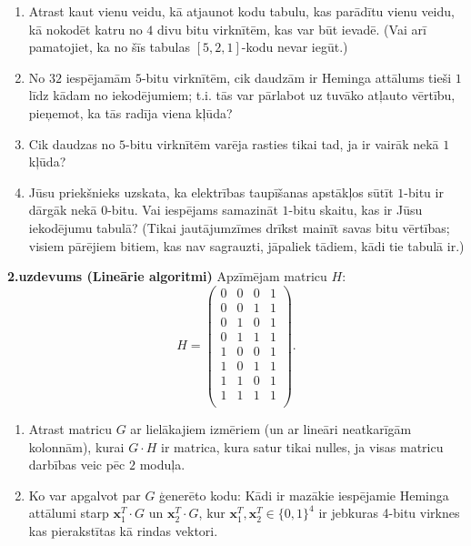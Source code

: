\documentclass[a4paper,12pt]{article}
\begin{document}
\begin{enumerate}
\item Atrast kaut vienu veidu, kā atjaunot kodu tabulu,
kas parādītu vienu veidu, kā nokodēt katru no $4$ divu bitu virknītēm, 
kas var būt ievadē. (Vai arī pamatojiet, ka no šīs tabulas 
$[5,2,1]$-kodu nevar iegūt.)
\item No $32$ iespējamām $5$-bitu virknītēm, cik dau\-dzām 
ir Heminga attālums tieši $1$
līdz kādam no iekodējumiem; t.i. tās var pārlabot uz tuvāko atļauto vērtību,
pieņemot, ka tās radīja viena kļūda?
\item Cik daudzas no $5$-bitu virknītēm 
varēja ras\-ties tikai tad, ja ir vairāk nekā $1$ kļūda?
\item Jūsu priekšnieks uzskata, ka elektrības tau\-pī\-ša\-nas apstākļos
sūtīt $1$-bitu ir dārgāk nekā $0$-bitu.
Vai iespējams samazināt $1$-bitu skai\-tu, kas ir Jūsu iekodējumu tabulā?
(Tikai jau\-tā\-jum\-zī\-mes drīkst mainīt 
savas bitu vēr\-tī\-bas; visiem pārējiem bitiem,
kas nav sagrauzti, jāpaliek tādiem, kādi tie tabulā ir.)
\end{enumerate}

\vspace{20pt}
{\bf 2.uzdevums (Lineārie algoritmi) }
Apzīmējam matricu $H$:
{\footnotesize
$$H = \left( \begin{array}{cccc}
0 & 0 & 0 & 1 \\
0 & 0 & 1 & 1 \\
0 & 1 & 0 & 1 \\
0 & 1 & 1 & 1 \\
1 & 0 & 0 & 1 \\
1 & 0 & 1 & 1 \\
1 & 1 & 0 & 1 \\
1 & 1 & 1 & 1 \\
\end{array} \right).$$
}

\begin{enumerate}
\item
Atrast matricu $G$ ar lielākajiem izmēriem (un ar lineāri neatkarīgām kolonnām), kurai 
$G \cdot H$ ir matrica, kura satur tikai nulles, ja visas matricu darbības veic pēc $2$ moduļa. 
\item Ko var apgalvot par $G$ ģenerēto kodu: Kādi ir mazākie iespējamie Heminga attālumi 
starp $\mathbf{x}_1^T \cdot G$ un $\mathbf{x}_2^T \cdot G$, kur
$\mathbf{x}_1^T, \mathbf{x}_2^T \in \{ 0,1 \}^4$ ir jebkuras 4-bitu virknes
kas pierakstītas kā rindas vektori.
\end{enumerate}
\end{document}
